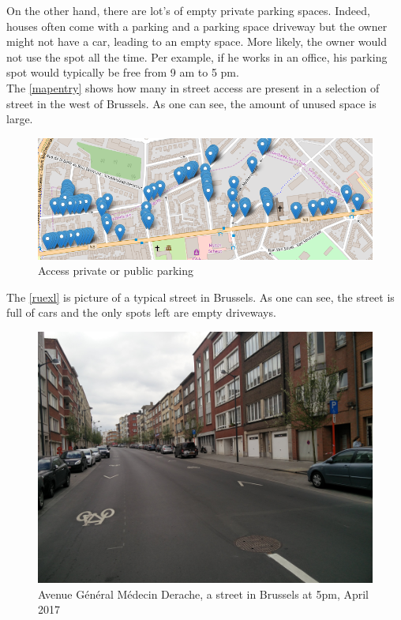 \documentclass[12pt,a4paper,oneside]{book}
\begin{document}
On the other hand, there are lot's of empty private parking spaces. Indeed, houses often come with a parking and a parking space driveway but the owner might not have a car, leading to an empty space. More likely, the owner would not use the spot all the time. Per example, if he works in an office, his parking spot would typically be free from 9 am to 5 pm.\\
The \autoref{mapentry} shows how many in street access are present in a selection of street in the west of Brussels. As one can see, the amount of unused space is large.\\


\begin{figure}[h]
\centering
\caption{Access private or public parking\cite{mapentrysrc}}
\label{mapentry}
\includegraphics[keepaspectratio=true,width=\textwidth-2cm]{images/casestudyander.png}
\end{figure}

The \autoref{ruexl} is picture of a typical street in Brussels. As one can see, the street is full of cars and the only spots left are empty driveways.

\begin{figure}[h]
\centering
\caption{Avenue Général Médecin Derache, a street in Brussels at 5pm, April 2017}
\label{ruexl}
\includegraphics[keepaspectratio=true,width=\textwidth-2cm]{images/ruexl.jpg}
\end{figure}
\end{document}
